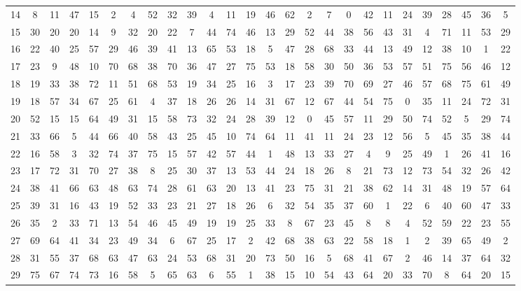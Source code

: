 \begin{table}
\begin{tabular}{c c c c c c c c c c c c c c c c c c c c c c c c c c }
14 & 8 & 11 & 47 & 15 & 2 & 4 & 52 & 32 & 39 & 4 & 11 & 19 & 46 & 62 & 2 & 7 & 0 & 42 & 11 & 24 & 39 & 28 & 45 & 36 & 5 \\
15 & 30 & 20 & 20 & 14 & 9 & 32 & 20 & 22 & 7 & 44 & 74 & 46 & 13 & 29 & 52 & 44 & 38 & 56 & 43 & 31 & 4 & 71 & 11 & 53 & 29 \\
16 & 22 & 40 & 25 & 57 & 29 & 46 & 39 & 41 & 13 & 65 & 53 & 18 & 5 & 47 & 28 & 68 & 33 & 44 & 13 & 49 & 12 & 38 & 10 & 1 & 22 \\
17 & 23 & 9 & 48 & 10 & 70 & 68 & 38 & 70 & 36 & 47 & 27 & 75 & 53 & 18 & 58 & 30 & 50 & 36 & 53 & 57 & 51 & 75 & 56 & 46 & 12 \\
18 & 19 & 33 & 38 & 72 & 11 & 51 & 68 & 53 & 19 & 34 & 25 & 16 & 3 & 17 & 23 & 39 & 70 & 69 & 27 & 46 & 57 & 68 & 75 & 61 & 49 \\
19 & 18 & 57 & 34 & 67 & 25 & 61 & 4 & 37 & 18 & 26 & 26 & 14 & 31 & 67 & 12 & 67 & 44 & 54 & 75 & 0 & 35 & 11 & 24 & 72 & 31 \\
20 & 52 & 15 & 15 & 64 & 49 & 31 & 15 & 58 & 73 & 32 & 24 & 28 & 39 & 12 & 0 & 45 & 57 & 11 & 29 & 50 & 74 & 52 & 5 & 29 & 74 \\
21 & 33 & 66 & 5 & 44 & 66 & 40 & 58 & 43 & 25 & 45 & 10 & 74 & 64 & 11 & 41 & 11 & 24 & 23 & 12 & 56 & 5 & 45 & 35 & 38 & 44 \\
22 & 16 & 58 & 3 & 32 & 74 & 37 & 75 & 15 & 57 & 42 & 57 & 44 & 1 & 48 & 13 & 33 & 27 & 4 & 9 & 25 & 49 & 1 & 26 & 41 & 16 \\
23 & 17 & 72 & 31 & 70 & 27 & 38 & 8 & 25 & 30 & 37 & 13 & 53 & 44 & 24 & 18 & 26 & 8 & 21 & 73 & 12 & 73 & 54 & 32 & 26 & 42 \\
24 & 38 & 41 & 66 & 63 & 48 & 63 & 74 & 28 & 61 & 63 & 20 & 13 & 41 & 23 & 75 & 31 & 21 & 38 & 62 & 14 & 31 & 48 & 19 & 57 & 64 \\
25 & 39 & 31 & 16 & 43 & 19 & 52 & 33 & 23 & 21 & 27 & 18 & 26 & 6 & 32 & 54 & 35 & 37 & 60 & 1 & 22 & 6 & 40 & 60 & 47 & 33 \\
26 & 35 & 2 & 33 & 71 & 13 & 54 & 46 & 45 & 49 & 19 & 19 & 25 & 33 & 8 & 67 & 23 & 45 & 8 & 8 & 4 & 52 & 59 & 22 & 23 & 55 \\
27 & 69 & 64 & 41 & 34 & 23 & 49 & 34 & 6 & 67 & 25 & 17 & 2 & 42 & 68 & 38 & 63 & 22 & 58 & 18 & 1 & 2 & 39 & 65 & 49 & 2 \\
28 & 31 & 55 & 37 & 68 & 63 & 47 & 63 & 24 & 53 & 68 & 31 & 20 & 73 & 50 & 16 & 5 & 68 & 41 & 67 & 2 & 46 & 14 & 37 & 64 & 32 \\
29 & 75 & 67 & 74 & 73 & 16 & 58 & 5 & 65 & 63 & 6 & 55 & 1 & 38 & 15 & 10 & 54 & 43 & 64 & 20 & 33 & 70 & 8 & 64 & 20 & 15 \\

\end{tabular}
\end{table}
